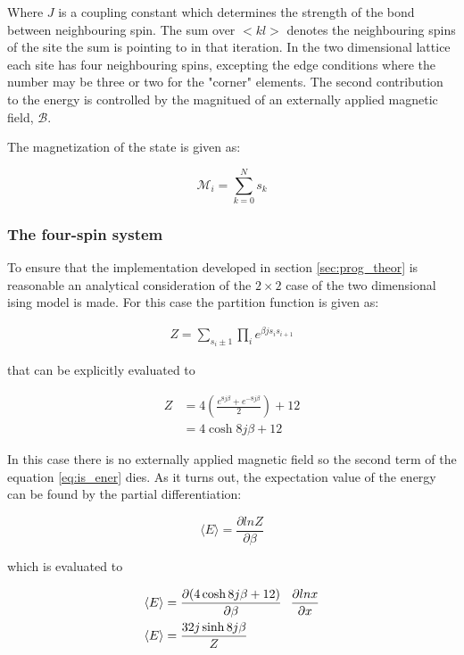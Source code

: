 \documentclass[12pt]{article}
\begin{document}
\noindent Where $J$ is a coupling constant which determines the strength of the bond between neighbouring spin. The sum over $<kl>$ denotes the neighbouring spins of the site the sum is pointing to in that iteration. In the two dimensional lattice each site has four neighbouring spins, excepting the edge conditions where the number may be three or two for the "corner" elements. The second contribution to the energy is controlled by the magnitued of an externally applied magnetic field, $\mathscr{B}$. 

\noindent The magnetization of the state is given as: 

\begin{equation}
\mathscr{M}_i = \sum^N _{k = 0} s_k
\end{equation}

\subsubsection{The four-spin system}
To ensure that the implementation developed in section \ref{sec:prog_theor} is reasonable an analytical consideration of the $2 \times 2 $ case of the two dimensional ising model is made. For this case the partition function is given as:

\begin{align*}
Z = \sum _{s_i \pm 1} \prod _i e^{\beta j s_i s_{i +1}}
\end{align*}

\noindent that can be explicitly evaluated to 

\begin{align*}
Z &= 4(\frac{e^{8j \beta } + e^{-8j\beta }}{2}) + 12 \\
 & = 4 \cosh{8j \beta} + 12
\end{align*}


\noindent In this case there is no externally applied magnetic field so the second term of the equation \ref{eq:is_ener} dies. As it turns out, the expectation value of the energy can be found by the partial differentiation:

\begin{equation}
\langle E \rangle = \frac{\partial ln Z}{\partial \beta}
\end{equation}

\noindent which is evaluated to 

\begin{align*} 
\langle E \rangle &= \frac{\partial (4 \cosh{8j\beta} +12)}{\partial \beta} \hspace*{0.1in}\frac{\partial ln x}{\partial x} \\
\langle E \rangle  &=  \frac{32 j \sinh{8j \beta} }{Z}
\end{align*}
\end{document}
